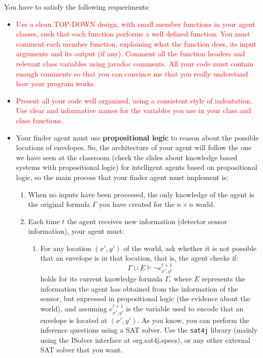 \documentclass{tufte-handout}
\begin{document}
\begin{fullwidth}
You have to satisfy the following requeriments:
\begin{itemize}
\item \textcolor{red}{Use a clean TOP-DOWN design, with small member functions in your
agent classes, such that each function performs a well defined function.
You must comment each member function, explaining what the function
does, its input arguments and its output (if any).
Comment all the function headers and relevant class variables using javadoc
comments.
All your code must contain enough comments so that you can convince
me that you really understand how your program works.}
\item \textcolor{red}{Present all your code well organized, using a consistent style of indentation. Use clear and informative names for the variables you use in your
class and class functions}.
\item Your finder agent must use {\bf propositional logic} to reason
 about the possible locations of envelopes. So, the architecture
of your agent will follow the one we have seen at the classroom
 (check the slides about knowledge based systems with propositional
logic) for intelligent agents based on propositional
logic, so the main process that your finder agent must   implement is:
\begin{enumerate}
\item When no inputs have been processed, the only knowledge of
the agent is the original formula $\Gamma$ you have created for
the $n\times n$ world.
\item Each time $t$ the agent receives new information (detector sensor information),
  your agent must:
\begin{enumerate}
\item For any location $(x',y')$ of the world, ask whether
it is not possible that an envelope is in that location, that is,
the agent checks if:
$$ \Gamma \cup E \models \neg e_{x',y'}^{t+1}  $$
holds for its current knowledge formula $\Gamma$, where $E$ represents
the information the agent has obtained from the information of the sensor,
 but expressed in propositional logic (the evidence about the world),
and assuming $e_{x',y'}^{t+1} $ is the variable used to encode that
an envelope is located at $(x',y')$.
As you know, you can perform the inference questions using a
 SAT solver. Use the {\tt sat4j} library (mainly using the ISolver interface at org.sat4j.specs), or any other external SAT solver that you want.

\end{enumerate}
\end{enumerate}
\end{itemize}
\end{fullwidth}
\end{document}
